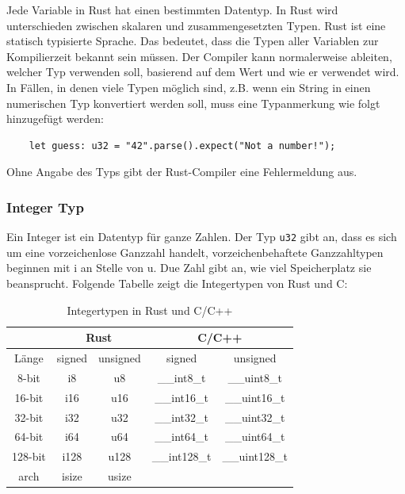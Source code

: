 Jede Variable in Rust hat einen bestimmten Datentyp. In Rust wird unterschieden zwischen skalaren und zusammengesetzten Typen. Rust ist eine statisch typisierte Sprache. Das bedeutet, dass die Typen aller Variablen zur Kompilierzeit bekannt sein müssen. Der Compiler kann normalerweise ableiten, welcher Typ verwenden soll, basierend auf dem Wert und wie er verwendet wird. In Fällen, in denen viele Typen möglich sind, z.B. wenn ein String in einen numerischen Typ konvertiert werden soll, muss eine Typanmerkung wie folgt hinzugefügt werden:

\begin{lstlisting}
    let guess: u32 = "42".parse().expect("Not a number!");
\end{lstlisting}

Ohne Angabe des Typs gibt der Rust-Compiler eine Fehlermeldung aus.

\subsubsection{Integer Typ}

Ein Integer ist ein Datentyp für ganze Zahlen. Der Typ \verb"u32" gibt an, dass es sich um eine vorzeichenlose Ganzzahl handelt, vorzeichenbehaftete Ganzzahltypen beginnen mit \glqq i\grqq{} an Stelle von \glqq u\grqq{}. Due Zahl gibt an, wie viel Speicherplatz sie beansprucht. Folgende Tabelle zeigt die Integertypen von Rust und C:

\begin{table}[htbp]
\centering
\begin{tabular}{|c||c|c||c|c|}
\hline
\rule[-1ex]{0pt}{2.5ex} & \multicolumn{2}{|c||}{Rust} & \multicolumn{2}{|c|}{C/C++} \\
\hline
\rule[-1ex]{0pt}{2.5ex} Länge & signed & unsigned & signed & unsigned \\
\hline
\rule[-1ex]{0pt}{2.5ex} 8-bit & i8 & u8 & \_\_int8\_t & \_\_uint8\_t \\
\hline
\rule[-1ex]{0pt}{2.5ex} 16-bit & i16 & u16 & \_\_int16\_t & \_\_uint16\_t \\
\hline
\rule[-1ex]{0pt}{2.5ex} 32-bit & i32 & u32 & \_\_int32\_t & \_\_uint32\_t \\
\hline
\rule[-1ex]{0pt}{2.5ex} 64-bit & i64 & u64 & \_\_int64\_t & \_\_uint64\_t \\
\hline
\rule[-1ex]{0pt}{2.5ex} 128-bit & i128 & u128 & \_\_int128\_t & \_\_uint128\_t \\
\hline
\rule[-1ex]{0pt}{2.5ex} arch & isize & usize & & \\
\hline
\end{tabular}
\caption{Integertypen in Rust und C/C++}
\end{table}

